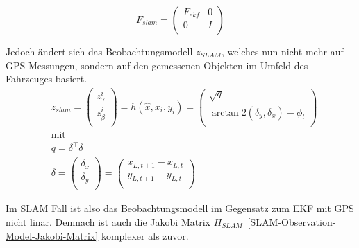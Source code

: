 \documentclass[11pt]{scrartcl}
\begin{document}
{\begin{equation}\label{SLAM-Bewegungsmodell-Jakobi-Matrix}
	F_{slam} = \begin{pmatrix}
		F_{ekf} & 0 \\
		0 & I \\
	\end{pmatrix}
\end{equation}

Jedoch ändert sich das Beobachtungsmodell $z_{SLAM}$, welches nun nicht mehr auf GPS Messungen, sondern auf den gemessenen Objekten im Umfeld des Fahrzeuges basiert.
\begin{equation}\label{SLAM-Observation-Model}
\begin{split}
	&z_{slam} = \begin{pmatrix}
		z_\gamma^i \\
		z_\beta^i \\
	\end{pmatrix} = h(\hat{x}, x_i, y_i) = \begin{pmatrix}
		\sqrt{q} \\
		\arctan 2(\delta_y, \delta_x) - \phi_t \\
	\end{pmatrix}\\
	&\text{mit} \\
	&q = \delta^\intercal \delta \\
	&\delta = \begin{pmatrix}
		\delta_x \\
		\delta_y \\
	\end{pmatrix} = \begin{pmatrix}
		x_{L, t+1} - x_{L, t}  \\
		y_{L, t+1}  - y_{L, t} \\
	\end{pmatrix}
\end{split}
\end{equation}

Im SLAM Fall ist also das Beobachtungsmodell im Gegensatz zum EKF mit GPS nicht linar. Demnach ist auch die Jakobi Matrix $H_{SLAM}$~\ref{SLAM-Observation-Model-Jakobi-Matrix} komplexer als zuvor.

}
\end{document}
